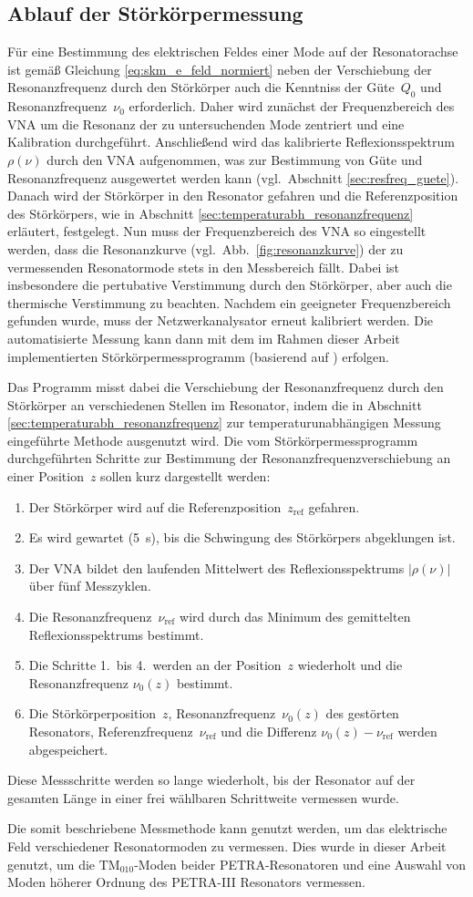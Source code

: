 \subsection{Ablauf der Störkörpermessung}
Für eine Bestimmung des elektrischen Feldes einer Mode auf der Resonatorachse ist gemäß Gleichung \eqref{eq:skm_e_feld_normiert} neben der Verschiebung der Resonanzfrequenz durch den Störkörper auch die Kenntniss der Güte~$Q_0$ und Resonanzfrequenz~$\nu_0$ erforderlich.
Daher wird zunächst der Frequenzbereich des VNA um die Resonanz der zu untersuchenden Mode zentriert und eine Kalibration durchgeführt.
Anschließend wird das kalibrierte Reflexionsspektrum $\rho(\nu)$ durch den VNA aufgenommen, was zur Bestimmung von Güte und Resonanzfrequenz ausgewertet werden kann (vgl.\ Abschnitt \ref{sec:resfreq_guete}).
Danach wird der Störkörper in den Resonator gefahren und die Referenzposition des Störkörpers, wie in Abschnitt \ref{sec:temperaturabh_resonanzfrequenz} erläutert, festgelegt.
Nun muss der Frequenzbereich des VNA so eingestellt werden, dass die Resonanzkurve (vgl.\ Abb.\ \ref{fig:resonanzkurve}) der zu vermessenden Resonatormode stets in den Messbereich fällt.
Dabei ist insbesondere die pertubative Verstimmung durch den Störkörper, aber auch die thermische Verstimmung zu beachten.
Nachdem ein geeigneter Frequenzbereich gefunden wurde, muss der Netzwerkanalysator erneut kalibriert werden.
Die automatisierte Messung kann dann mit dem im Rahmen dieser Arbeit implementierten Störkörpermessprogramm (basierend auf \cite{schedler_prog}) erfolgen.

Das Programm misst dabei die Verschiebung der Resonanzfrequenz durch den Störkörper an verschiedenen Stellen im Resonator, indem die in Abschnitt \ref{sec:temperaturabh_resonanzfrequenz} zur temperaturunabhängigen Messung eingeführte Methode ausgenutzt wird.
Die vom Störkörpermessprogramm durchgeführten Schritte zur Bestimmung der Resonanzfrequenzverschiebung an einer Position~$z$ sollen kurz dargestellt werden:
\begin{enumerate}
	\item Der Störkörper wird auf die Referenzposition~$z_\mathrm{ref}$ gefahren.
	\item Es wird gewartet (\SI{5}{s}), bis die Schwingung des Störkörpers abgeklungen ist.
	\item Der VNA bildet den laufenden Mittelwert des Reflexionsspektrums $|\rho(\nu)|$ über fünf Messzyklen.
	\item Die Resonanzfrequenz~$\nu_\mathrm{ref}$ wird durch das Minimum des gemittelten Reflexionsspektrums bestimmt.
	\item Die Schritte 1.\ bis 4.\ werden an der Position~$z$ wiederholt und die Resonanzfrequenz $\nu_0(z)$ bestimmt.
	\item Die Störkörperposition~$z$, Resonanzfrequenz~$\nu_0(z)$ des gestörten Resonators, Referenzfrequenz~$\nu_\mathrm{ref}$ und die Differenz \mbox{$\nu_0(z) - \nu_\mathrm{ref}$} werden abgespeichert.
\end{enumerate}
Diese Messschritte werden so lange wiederholt, bis der Resonator auf der gesamten Länge in einer frei wählbaren Schrittweite vermessen wurde.

Die somit beschriebene Messmethode kann genutzt werden, um das elektrische Feld verschiedener Resonatormoden zu vermessen.
Dies wurde in dieser Arbeit genutzt, um die $\mathrm{TM}_{010}$-Moden beider PETRA-Resonatoren und eine Auswahl von Moden höherer Ordnung des PETRA-III Resonators vermessen.